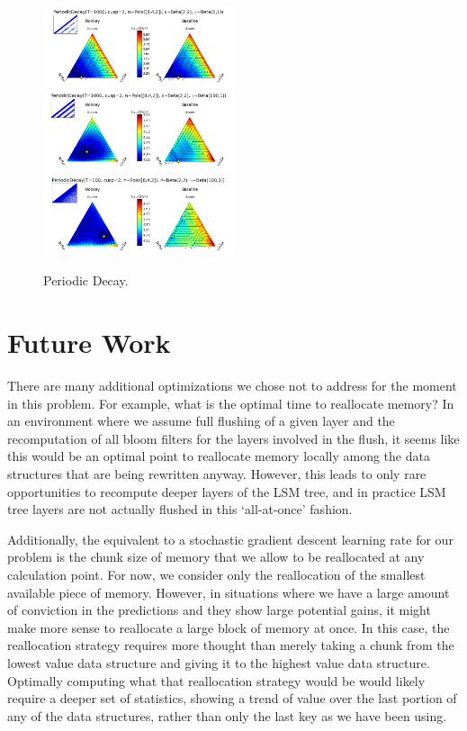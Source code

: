 \documentclass{sig-alternate-05-2015}
\begin{document}
\begin{figure}[!htb]
\begin{center}
\includegraphics[width=0.5\textwidth]{periodquiv3.png}
\includegraphics[width=0.5\textwidth]{periodquiv2.png}
\includegraphics[width=0.5\textwidth]{periodquiv1.png}
\end{center}
\caption{Periodic Decay.}
\label{fig:periodquiv}
\end{figure}

\section{Future Work}

There are many additional optimizations we chose not to address for the moment in this problem. For example, what is the optimal time to reallocate memory? In an environment where we assume full flushing of a given layer and the recomputation of all bloom filters for the layers involved in the flush, it seems like this would be an optimal point to reallocate memory locally among the data structures that are being rewritten anyway. However, this leads to only rare opportunities to recompute deeper layers of the LSM tree, and in practice LSM tree layers are not actually flushed in this `all-at-once' fashion. 

Additionally, the equivalent to a stochastic gradient descent learning rate for our problem is the chunk size of memory that we allow to be reallocated at any calculation point. For now, we consider only the reallocation of the smallest available piece of memory. However, in situations where we have a large amount of conviction in the predictions and they show large potential gains, it might make more sense to reallocate a large block of memory at once. In this case, the reallocation strategy requires more thought than merely taking a chunk from the lowest value data structure and giving it to the highest value data structure. Optimally computing what that reallocation strategy would be would likely require a deeper set of statistics, showing a trend of value over the last portion of any of the data structures, rather than only the last key as we have been using.
\end{document}
